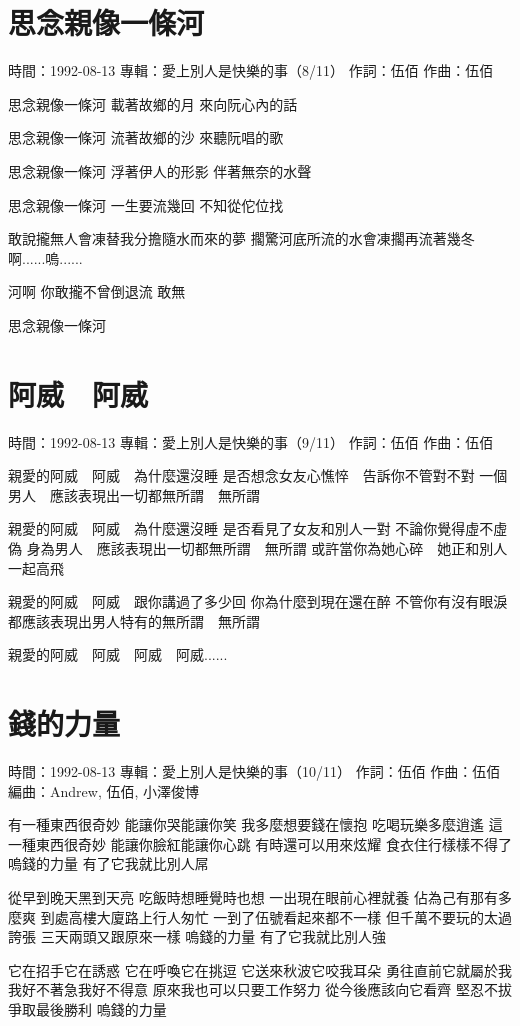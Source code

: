 \documentclass[UTF8,a4paper,oneside,twocolumn,12pt]{ctexbook}
\newcommand{\infopair}[2]{\textbullet #1：#2}
\newcommand{\zc}[1][伍佰]{\infopair{作詞}{#1}}
\newcommand{\zq}[1][伍佰]{\infopair{作曲}{#1}}
\newcommand{\bq}[1][伍佰]{\infopair{編曲}{#1}}
\newcommand{\zj}[1]{\infopair{專輯}{#1}}
\newcommand{\sj}[1]{\infopair{時間}{#1}}
\newenvironment{info}{\begin{flushleft}\kaishu
	}
	{\end{flushleft}\normalsize\yahei\par}
\newenvironment{lyric}{
	}
{}
\begin{document}
\section{思念親像一條河}
\begin{info}
	\sj{1992-08-13}
	\zj{愛上別人是快樂的事（8/11）}
	\zc
	\zq
\end{info}
\begin{lyric}
	思念親像一條河
	載著故鄉的月
	來向阮心內的話

	思念親像一條河
	流著故鄉的沙
	來聽阮唱的歌

	思念親像一條河
	浮著伊人的形影
	伴著無奈的水聲

	思念親像一條河
	一生要流幾回
	不知從佗位找

	敢說攏無人會凍替我分擔隨水而來的夢
	擱驚河底所流的水會凍擱再流著幾冬
	啊......嗚......

	河啊
	你敢攏不曾倒退流
	敢無

	思念親像一條河
\end{lyric}

\section{阿威　阿威}
\begin{info}
	\sj{1992-08-13}
	\zj{愛上別人是快樂的事（9/11）}
	\zc
	\zq
\end{info}
\begin{lyric}
	親愛的阿威　阿威　為什麼還沒睡
	是否想念女友心憔悴　告訴你不管對不對
	一個男人　應該表現出一切都無所謂　無所謂

	親愛的阿威　阿威　為什麼還沒睡
	是否看見了女友和別人一對
	不論你覺得虛不虛偽
	身為男人　應該表現出一切都無所謂　無所謂
	或許當你為她心碎　她正和別人一起高飛

	親愛的阿威　阿威　跟你講過了多少回
	你為什麼到現在還在醉
	不管你有沒有眼淚
	都應該表現出男人特有的無所謂　無所謂

	親愛的阿威　阿威　阿威　阿威......
\end{lyric}

\section{錢的力量}
\begin{info}
	\sj{1992-08-13}
	\zj{愛上別人是快樂的事（10/11）}
	\zc
	\zq
	\bq[Andrew, 伍佰, 小澤俊博]
\end{info}
\begin{lyric}
	有一種東西很奇妙
	能讓你哭能讓你笑
	我多麼想要錢在懷抱
	吃喝玩樂多麼逍遙
	這一種東西很奇妙
	能讓你臉紅能讓你心跳
	有時還可以用來炫耀
	食衣住行樣樣不得了
	嗚錢的力量
	有了它我就比別人屌

	從早到晚天黑到天亮
	吃飯時想睡覺時也想
	一出現在眼前心裡就養
	佔為己有那有多麼爽
	到處高樓大廈路上行人匆忙
	一到了伍號看起來都不一樣
	但千萬不要玩的太過誇張
	三天兩頭又跟原來一樣
	嗚錢的力量
	有了它我就比別人強

	它在招手它在誘惑
	它在呼喚它在挑逗
	它送來秋波它咬我耳朵
	勇往直前它就屬於我
	我好不著急我好不得意
	原來我也可以只要工作努力
	從今後應該向它看齊
	堅忍不拔爭取最後勝利
	嗚錢的力量
\end{lyric}
\end{document}
